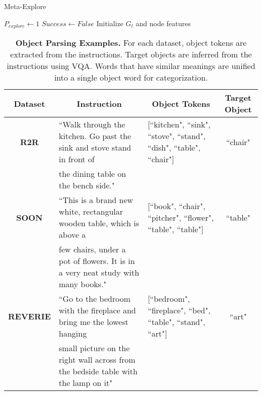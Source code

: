 \documentclass[10pt,twocolumn,letterpaper]{article}
\begin{document}
\begin{algorithm}[htb]
\SetAlgoLined
\DontPrintSemicolon
        \caption{Meta-Explore} \label{alg:meta-explore}
        ${{P}}_{explore} \gets 1$\;
        $Success \gets False$\;
        Initialize $G_t$ and node features\;
\end{algorithm}

\begin{table*}[]
\centering
\setlength{\tabcolsep}{3.4pt}
\fontsize{7}{10}\selectfont
\begin{tabular}{c|l|l|c}
\toprule
\textbf{Dataset} & \multicolumn{1}{c|}{\textbf{Instruction}} & \multicolumn{1}{c|}{\textbf{Object Tokens}} & \multicolumn{1}{c}{\textbf{Target Object}} \\ \hline\hline
\textbf{R2R} & ``Walk through the kitchen. Go past the sink and stove stand in front of & {[}``kitchen", ``sink", ``stove", ``stand", ``dish", ``table", ``chair"{]} & ``chair"\\
 & the dining table on the bench side." &  \\ \hline
\textbf{SOON} & ``This is a brand new white, rectangular wooden table, which is above a & {[}``book",  ``chair", ``pitcher", ``flower", ``table", ``table"{]} & ``table"\\
 & few chairs, under a pot of flowers. It is in a very neat study with many books." &  \\ \hline
\textbf{REVERIE} & ``Go to the bedroom with the fireplace and bring me the lowest hanging & {[}``bedroom", ``fireplace", ``bed", ``table", ``stand", ``art"{]} & ``art"\\
 & small picture on the right wall across from the bedside table with the lamp on it" & \\
 \bottomrule
\end{tabular}\caption{\small \textbf{Object Parsing Examples.} For each dataset, object tokens are extracted from the instructions. Target objects are inferred from the instructions using VQA. Words that have similar meanings are unified into a single object word for categorization.}
\label{tab:object-parsing-examples}\vspace{-0.4cm}
\end{table*}
\end{document}
